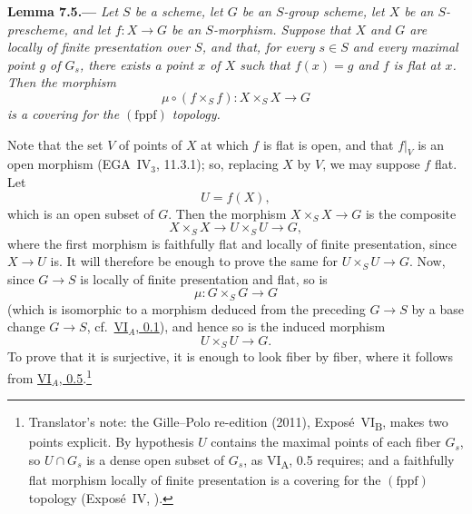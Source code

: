 
\medskip
{}\label{lem:sga3-VIB-7.5}%
\noindent\textbf{Lemma 7.5.---}
\emph{Let \(S\) be a scheme, let \(G\) be an \(S\)-group
scheme, let \(X\) be an \(S\)-prescheme, and let
\(f:X\to G\) be an \(S\)-morphism. Suppose that \(X\) and \(G\)
are locally of finite presentation over \(S\), and that, for
every \(s\in S\) and every maximal point \(g\) of \(G_s\),
there exists a point \(x\) of \(X\) such that \(f(x)=g\) and
\(f\) is flat at \(x\). Then the morphism}
\label{form:sga3-VIB-7.5-covering-morphism}%
\[
  \mu\circ(f\times_S f):
  X\times_S X\longrightarrow G
\]
\emph{is a covering for the \((\mathrm{fppf})\) topology.}

Note that the set \(V\) of points of \(X\) at which \(f\) is
flat is open, and that \(f|_V\) is an open morphism
(EGA~IV\(_3\), 11.3.1); so, replacing \(X\) by \(V\), we may
suppose \(f\) flat. Let
\[
  U=f(X),
\]
which is an open subset of \(G\). Then the morphism
\(X\times_SX\to G\) is the composite
\label{form:sga3-VIB-7.5-factorization}%
\[
  X\times_S X
  \longrightarrow
  U\times_S U
  \longrightarrow
  G,
\]
where the first morphism is faithfully flat and locally of
finite presentation, since \(X\to U\) is. It will therefore be
enough to prove the same for \(U\times_SU\to G\). Now, since
\(G\to S\) is locally of finite presentation and flat, so is
\[
  \mu:G\times_S G\longrightarrow G
\]
(which is isomorphic to a morphism deduced from the preceding
\(G\to S\) by a base change \(G\to S\), cf.\
\hyperref[sga3:VIA:0.1]{VI\(_A\), 0.1}), and hence so is the
induced morphism
\[
  U\times_S U\longrightarrow G.
\]
To prove that it is surjective, it is enough to look fiber by
fiber, where it follows from
\hyperref[sga3:VIA:0.5]{VI\(_A\), 0.5}.\footnote{Translator's note: the Gille--Polo re-edition (2011),
Exposé~VI\textsubscript{B}, makes two points explicit. By hypothesis \(U\) contains the maximal points of
each fiber \(G_s\), so \(U\cap G_s\) is a dense open subset of \(G_s\), as VI\textsubscript{A}, 0.5
requires; and a faithfully flat morphism locally of finite presentation is a covering for the
\((\mathrm{fppf})\) topology (Exposé~IV, ).}
